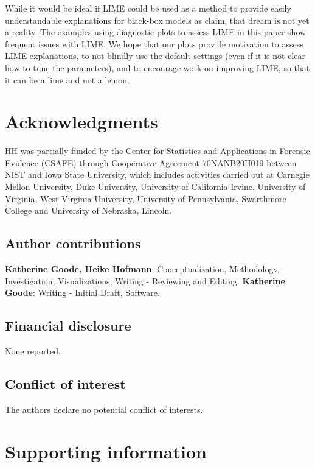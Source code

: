 \documentclass[AMS,STIX2COL]{WileyNJD-v2}\usepackage[]{graphicx}\usepackage[]{color}
\begin{document}
While it would be ideal if LIME could be used as a method to provide easily understandable explanations for black-box models as \citet{ribeiro:2016} claim, that dream is not yet a reality. The examples using diagnostic plots to assess LIME in this paper show frequent issues with LIME. We hope that our plots provide motivation to assess LIME explanations, to not blindly use the default settings (even if it is not clear how to tune the parameters), and to encourage work on improving LIME, so that it can be a lime and not a lemon.

\section*{Acknowledgments}

HH was partially funded by the Center for Statistics and Applications in Forensic Evidence (CSAFE) through Cooperative Agreement 70NANB20H019 between NIST and Iowa State University, which includes activities carried out at Carnegie Mellon University, Duke University, University of California Irvine, University of Virginia, West Virginia University, University of Pennsylvania, Swarthmore College and University of Nebraska, Lincoln.

\subsection*{Author contributions}

{\bf Katherine Goode, Heike Hofmann}: Conceptualization, Methodology, Investigation, Visualizations, Writing - Reviewing and Editing. {\bf Katherine Goode}: Writing - Initial Draft, Software.

\subsection*{Financial disclosure}

None reported.

\subsection*{Conflict of interest}

The authors declare no potential conflict of interests.

\section*{Supporting information}
\end{document}
